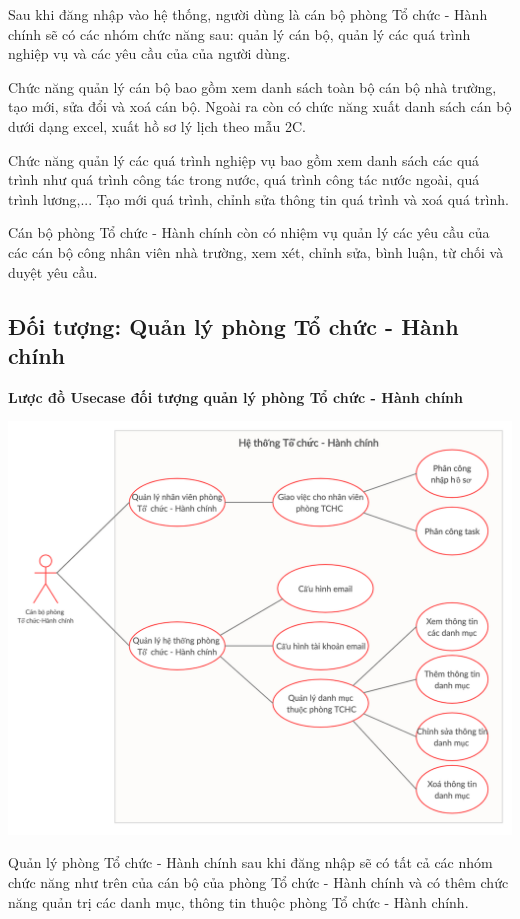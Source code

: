 Sau khi đăng nhập vào hệ thống, người dùng là cán bộ phòng Tổ chức - Hành chính sẽ có các nhóm chức năng sau: quản lý cán bộ, quản lý các quá trình nghiệp vụ và các yêu cầu của của người dùng.

Chức năng quản lý cán bộ bao gồm xem danh sách toàn bộ cán bộ nhà trường, tạo mới, sửa đổi và xoá cán bộ. Ngoài ra còn có chức năng xuất danh sách cán bộ dưới dạng excel, xuất hồ sơ lý lịch theo mẫu 2C.

Chức năng quản lý các quá trình nghiệp vụ bao gồm xem danh sách các quá trình như quá trình công tác trong nước, quá trình công tác nước ngoài, quá trình lương,... Tạo mới quá trình, chỉnh sửa thông tin quá trình và xoá quá trình.

Cán bộ phòng Tổ chức - Hành chính còn có nhiệm vụ quản lý các yêu cầu của các cán bộ công nhân viên nhà trường, xem xét, chỉnh sửa, bình luận, từ chối và duyệt yêu cầu.

\subsection{Đối tượng: Quản lý phòng Tổ chức - Hành chính}
\textbf{Lược đồ Usecase đối tượng quản lý phòng Tổ chức - Hành chính}
\begin{center}
  \captionsetup{type=figure}
  \includegraphics[width=15cm]{img/usecase/quanLyPhong.png}
\end{center}
Quản lý phòng Tổ chức - Hành chính sau khi đăng nhập sẽ có tất cả các nhóm chức năng như trên của cán bộ của phòng Tổ chức - Hành chính và có thêm chức năng quản trị các danh mục, thông tin thuộc phòng Tổ chức - Hành chính.

